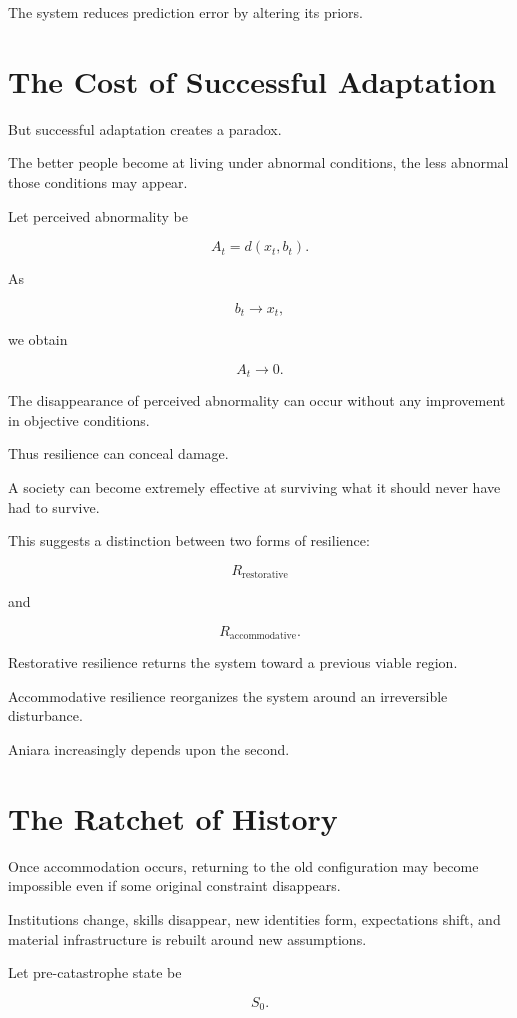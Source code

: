 \documentclass[11pt,oneside]{book}
\theoremstyle{definition}
\theoremstyle{remark}
\begin{document}
The system reduces prediction error by altering its priors.

\section{The Cost of Successful Adaptation}

But successful adaptation creates a paradox.

The better people become at living under abnormal conditions, the less abnormal those conditions may appear.

Let perceived abnormality be

\[
A_t
=
d(x_t,b_t).
\]

As

\[
b_t\rightarrow x_t,
\]

we obtain

\[
A_t\rightarrow0.
\]

The disappearance of perceived abnormality can occur without any improvement in objective conditions.

Thus resilience can conceal damage.

A society can become extremely effective at surviving what it should never have had to survive.

This suggests a distinction between two forms of resilience:

\[
R_{\mathrm{restorative}}
\]

and

\[
R_{\mathrm{accommodative}}.
\]

Restorative resilience returns the system toward a previous viable region.

Accommodative resilience reorganizes the system around an irreversible disturbance.

Aniara increasingly depends upon the second.

\section{The Ratchet of History}

Once accommodation occurs, returning to the old configuration may become impossible even if some original constraint disappears.

Institutions change, skills disappear, new identities form, expectations shift, and material infrastructure is rebuilt around new assumptions.

Let pre-catastrophe state be

\[
S_0.
\]
\end{document}
